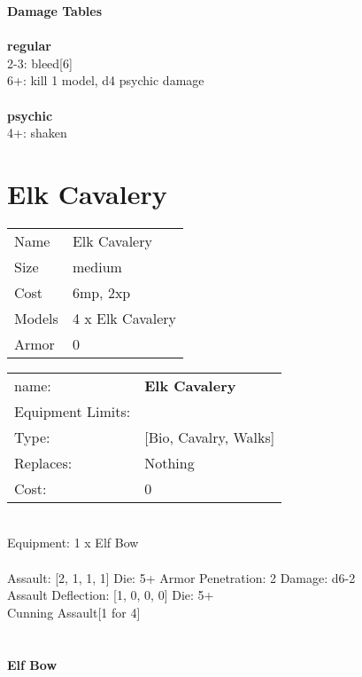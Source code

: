 {\bf Damage Tables} \\
\ \\ {\bf regular } \\
2-3: bleed[6] \\
6+: kill 1 model, d4 psychic damage \\
\ \\ {\bf psychic } \\
4+: shaken \\










\pagebreak\pagebreak

\section{ Elk Cavalery }

\begin{tabular}{ll}
  Name & Elk Cavalery \\
  Size & medium\\
  Cost & 6mp, 2xp\\
  Models & 4 x Elk Cavalery\\
  Armor & 0\\
\end{tabular}

\noindent 

\noindent
\begin{tabular}{ll}
name: &{\bf Elk Cavalery } \\
Equipment Limits: & \\
Type: &[Bio, Cavalry, Walks] \\
Replaces: &Nothing \\
Cost: & 0\\
\end{tabular}
\ \\
Equipment: 1 x Elf Bow \\
\ \\
Assault: [2, 1, 1, 1] Die: 5+ Armor Penetration: 2 Damage: d6-2 \\
Assault Deflection: [1, 0, 0, 0] Die: 5+\\
\indent Cunning Assault[1 for 4]\\ 
 
\ \\

\ \\
{\bf Elf Bow } \\



